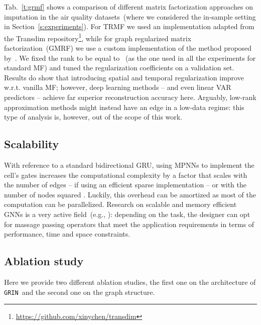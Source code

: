 \documentclass{article} \usepackage{iclr2022_conference,times}
\newcommand{\GRIL}{\texttt{GRIN}}
\begin{document}
Tab.~\ref{t:grmf} shows a comparison of different matrix factorization approaches on imputation in the air quality datasets~(where we considered the in-sample setting in Section~\ref{s:experiments}). For TRMF we used an implementation adapted from the Transdim repository\footnote{\url{https://github.com/xinychen/transdim}}, while for graph regularized matrix factorization~(GMRF) we use a custom implementation of the method proposed by~\citet{cai2010graph}. We fixed the rank to be equal to ~(as the one used in all the experiments for standard MF) and tuned the regularization coefficients on a validation set. Results do show that introducing spatial and temporal regularization improve w.r.t. vanilla MF; however, deep learning methods -- and even linear VAR predictors -- achieve far superior reconstruction accuracy here. Arguably, low-rank approximation methods might instead have an edge in a low-data regime: this type of analysis is, however, out of the scope of this work.

\subsection{Scalability}

With reference to a standard bidirectional GRU, using MPNNs to implement the cell's gates increases the computational complexity by a factor that scales with the number of edges  -- if using an efficient sparse implementation -- or with the number of nodes squared . Luckily, this overhead can be amortized as most of the computation can be parallelized. Research on scalable and memory efficient GNNs is a very active field~(e.g., \citealp{hamilton2017inductive, frasca2021sign}): depending on the task, the designer can opt for massage passing operators that meet the application requirements in terms of performance, time and space constraints.

\subsection{Ablation study}

Here we provide two different ablation studies, the first one on the architecture of \GRIL\ and the second one on the graph structure.
\end{document}
